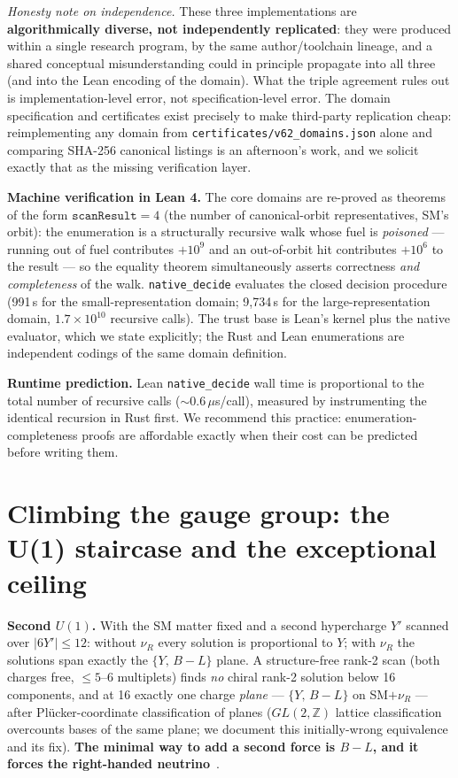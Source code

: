 \documentclass[aps,prd,preprint,nofootinbib]{revtex4-2}
\begin{document}
\emph{Honesty note on independence.} These three implementations are
\textbf{algorithmically diverse, not independently replicated}: they were
produced within a single research program, by the same author/toolchain
lineage, and a shared conceptual misunderstanding could in principle propagate
into all three (and into the Lean encoding of the domain). What the triple
agreement rules out is implementation-level error, not specification-level
error. The domain specification and certificates exist precisely to make
third-party replication cheap: reimplementing any domain from
\texttt{certificates/v62\_domains.json} alone and comparing SHA-256 canonical
listings is an afternoon's work, and we solicit exactly that as the missing
verification layer.

\textbf{Machine verification in Lean 4.} The core domains are re-proved as
theorems of the form $\texttt{scanResult}=4$ (the number of canonical-orbit
representatives, SM's orbit): the enumeration is a structurally recursive walk
whose fuel is \emph{poisoned} --- running out of fuel contributes $+10^9$ and
an out-of-orbit hit contributes $+10^6$ to the result --- so the equality
theorem simultaneously asserts correctness \emph{and completeness} of the walk.
\texttt{native\_decide} evaluates the closed decision procedure (991\,s for the
small-representation domain; 9{,}734\,s for the large-representation domain,
$1.7\times 10^{10}$ recursive calls). The trust base is Lean's kernel plus the
native evaluator, which we state explicitly; the Rust and Lean enumerations are
independent codings of the same domain definition.

\textbf{Runtime prediction.} Lean \texttt{native\_decide} wall time is
proportional to the total number of recursive calls ($\sim 0.6\,\mu$s/call),
measured by instrumenting the identical recursion in Rust first. We recommend
this practice: enumeration-completeness proofs are affordable exactly when
their cost can be predicted before writing them.

\section{Climbing the gauge group: the U(1) staircase and the exceptional ceiling}

\textbf{Second $U(1)$.} With the SM matter fixed and a second hypercharge $Y'$
scanned over $|6Y'|\le 12$: without $\nu_R$ every solution is proportional to
$Y$; with $\nu_R$ the solutions span exactly the $\{Y,\,B-L\}$ plane. A
structure-free rank-2 scan (both charges free, $\le 5$--$6$ multiplets) finds
\emph{no} chiral rank-2 solution below 16 components, and at 16 exactly one
charge \emph{plane} --- $\{Y,\,B-L\}$ on SM$+\nu_R$ --- after
Pl\"ucker-coordinate classification of planes ($GL(2,\mathbb{Z})$ lattice
classification overcounts bases of the same plane; we document this
initially-wrong equivalence and its fix). \textbf{The minimal way to add a
second force is $B-L$, and it forces the right-handed
neutrino}~\cite{BabuMohapatra,Foot,Allanach,Costa}.
\end{document}
